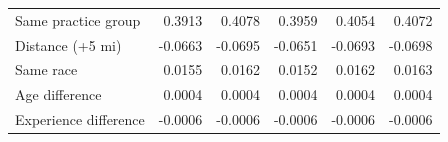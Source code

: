 \begin{tabular}{lrrrrr}
\hspace{1em}Same practice group & 0.3913 & 0.4078 & 0.3959 & 0.4054 & 0.4072\\
\hspace{1em}Distance (+5 mi) & -0.0663 & -0.0695 & -0.0651 & -0.0693 & -0.0698\\
\hspace{1em}Same race & 0.0155 & 0.0162 & 0.0152 & 0.0162 & 0.0163\\
\hspace{1em}Age difference & 0.0004 & 0.0004 & 0.0004 & 0.0004 & 0.0004\\
\hspace{1em}Experience difference & -0.0006 & -0.0006 & -0.0006 & -0.0006 & -0.0006\\
\bottomrule
\end{tabular}

